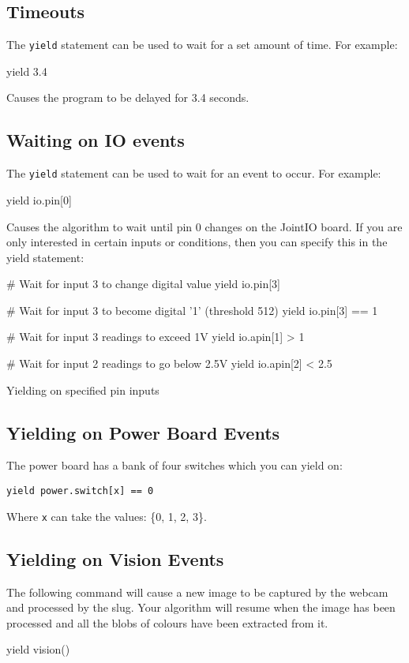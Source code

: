 \documentclass[a4paper, 12pt]{article}
\begin{document}
\subsection{Timeouts}
The \texttt{yield} statement can be used to wait for a set amount of
time.  For example:

\begin{verbatimtab}
yield 3.4
\end{verbatimtab}

Causes the program to be delayed for 3.4 seconds.

\subsection{Waiting on IO events}
The \texttt{yield} statement can be used to wait for an event to
occur.  For example:

\begin{verbatimtab}
yield io.pin[0]
\end{verbatimtab}

Causes the algorithm to wait until pin 0 changes on the JointIO board.  If you are only interested in certain inputs or conditions, then you can specify this in the yield statement:
\begin{python}
\begin{verbatimtab}
# Wait for input 3 to change digital value
yield io.pin[3]
        
# Wait for input 3 to become digital '1' (threshold 512)
yield io.pin[3] == 1
        
# Wait for input 3 readings to exceed 1V
yield io.apin[1] > 1
        
# Wait for input 2 readings to go below 2.5V
yield io.apin[2] < 2.5
\end{verbatimtab} 
\caption{\label{py:yieldio}Yielding on specified pin inputs}
\end{python}


\subsection{Yielding on Power Board Events}
The power board has a bank of four switches which you can yield on:
\begin{verbatim}
yield power.switch[x] == 0
\end{verbatim}
Where \texttt{x} can take the values: \{0, 1, 2, 3\}.


\subsection{Yielding on Vision Events}
The following command will cause a new image to be captured by the webcam and processed by the slug. Your algorithm will resume when the image has been processed and all the blobs of colours have been extracted from it.
\begin{verbatimtab}
yield vision()
\end{verbatimtab}
\end{document}
